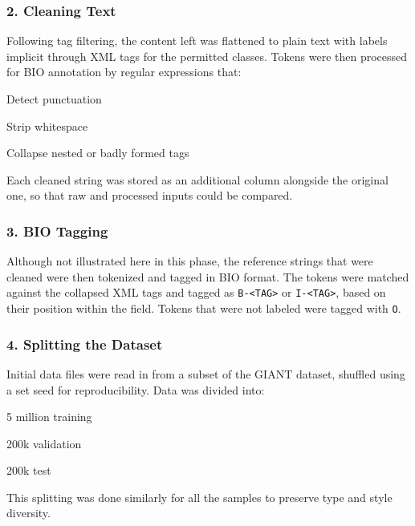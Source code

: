 \subsubsection{2. Cleaning Text}
Following tag filtering, the content left was flattened to plain text with labels implicit through XML tags for the permitted classes. Tokens were then processed for BIO annotation by regular expressions that:
\begin{compactitem}
\item Detect punctuation
\item Strip whitespace
\item Collapse nested or badly formed tags
\end{compactitem}
Each cleaned string was stored as an additional column alongside the original one, so that raw and processed inputs could be compared. 
\subsubsection{3. BIO Tagging}
Although not illustrated here in this phase, the reference strings that were cleaned were then tokenized and tagged in BIO format. The tokens were matched against the collapsed XML tags and tagged as \texttt{B-<TAG>} or \texttt{I-<TAG>}, based on their position within the field. Tokens that were not labeled were tagged with \texttt{O}.
\subsubsection{4. Splitting the Dataset}
Initial data files were read in from a subset of the GIANT dataset, shuffled using a set seed for reproducibility. Data was divided into:
\begin{compactitem}
\item 5 million training
\item 200k validation
\item 200k test
\end{compactitem}
This splitting was done similarly for all the samples to preserve type and style diversity.

